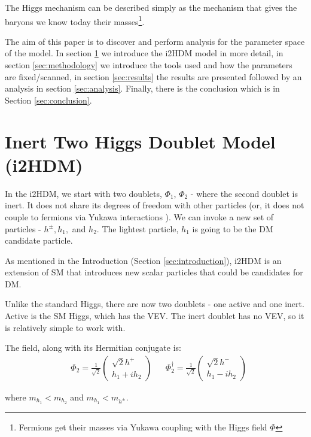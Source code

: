 \documentclass[12pt]{article}
\begin{document}
The Higgs mechanism can be described simply as the mechanism that gives the baryons we know today their masses\footnote{Fermions get their masses via Yukawa coupling with the Higgs field $\Phi$}.

The aim of this paper is to discover and perform analysis for the parameter space of the model. In section \ref{sec:i2HDM} we introduce the i2HDM model in more detail, in section \ref{sec:methodology} we introduce the tools used and how the parameters are fixed/scanned, in section \ref{sec:results} the results are presented followed by an analysis in section \ref{sec:analysis}. Finally, there is the conclusion which is in Section \ref{sec:conclusion}.

\section{Inert Two Higgs Doublet Model (i2HDM)}
\label{sec:i2HDM}
In the i2HDM, we start with two doublets, $\Phi_1$, $\Phi_2$ - where the second doublet is inert. It does not share its degrees of freedom with other particles (or, it does not couple to fermions via Yukawa interactions \cite{Belyaev_2022}). We can invoke a new set of particles - $h^\pm, h_1,$ and $h_2$. The lightest particle, $h_1$ is going to be the DM candidate particle.

As mentioned in the Introduction (Section \ref{sec:introduction}), i2HDM is an extension of SM that introduces new scalar particles that could be candidates for DM.

Unlike the standard Higgs, there are now two doublets - one active and one inert. Active is the SM Higgs, which has the VEV. The inert doublet has no VEV, so it is relatively simple to work with.

 The field, along with its Hermitian conjugate is:
\begin{align}
    &\Phi_2 = \frac{1}{\sqrt{2}}
        \begin{pmatrix}
            {\sqrt{2}h^+} \\
            {h_1 + ih_2 }
        \end{pmatrix}&
    &\Phi_2^\dagger = \frac{1}{\sqrt{2}} 
        \begin{pmatrix}
            {\sqrt{2}h^-} \\
            {h_1 - ih_2 }
        \end{pmatrix}
\end{align}

where $m_{h_1} < m_{h_2}$ and $m_{h_1} < m_{h^\pm}$. 
\end{document}
